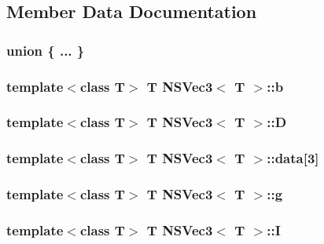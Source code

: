 \subsection{Member Data Documentation}
\hypertarget{structNSVec3_a03e28ca6d54600478013ce033113af94}{\subsubsection[{"@53}]{\setlength{\rightskip}{0pt plus 5cm}union \{ ... \} }}\label{structNSVec3_a03e28ca6d54600478013ce033113af94}
\hypertarget{structNSVec3_aadd7462fb6f7d7df83cb8ffd1645eb8b}{
\subsubsection[{b}]{\setlength{\rightskip}{0pt plus 5cm}template$<$class T$>$ T {\bf N\-S\-Vec3}$<$ T $>$\-::b}}\label{structNSVec3_aadd7462fb6f7d7df83cb8ffd1645eb8b}
\hypertarget{structNSVec3_abb8768d33c0752160bd78e978d6625b9}{
\subsubsection[{D}]{\setlength{\rightskip}{0pt plus 5cm}template$<$class T$>$ T {\bf N\-S\-Vec3}$<$ T $>$\-::D}}\label{structNSVec3_abb8768d33c0752160bd78e978d6625b9}
\hypertarget{structNSVec3_a82314c4b8d4619ba32b4b3f9c58f5a2c}{
\subsubsection[{data}]{\setlength{\rightskip}{0pt plus 5cm}template$<$class T$>$ T {\bf N\-S\-Vec3}$<$ T $>$\-::data\mbox{[}3\mbox{]}}}\label{structNSVec3_a82314c4b8d4619ba32b4b3f9c58f5a2c}
\hypertarget{structNSVec3_af4da81fc8e3a7ce2c16481ca7ac01021}{
\subsubsection[{g}]{\setlength{\rightskip}{0pt plus 5cm}template$<$class T$>$ T {\bf N\-S\-Vec3}$<$ T $>$\-::g}}\label{structNSVec3_af4da81fc8e3a7ce2c16481ca7ac01021}
\hypertarget{structNSVec3_a2b2d6da3c41bfa78589cd09b79b09de6}{
\subsubsection[{I}]{\setlength{\rightskip}{0pt plus 5cm}template$<$class T$>$ T {\bf N\-S\-Vec3}$<$ T $>$\-::I}}\label{structNSVec3_a2b2d6da3c41bfa78589cd09b79b09de6}
